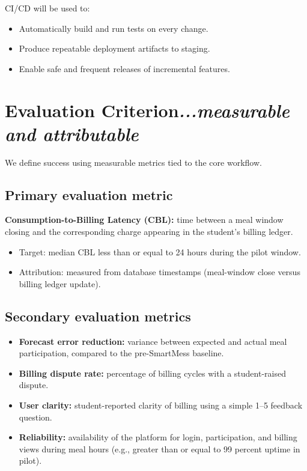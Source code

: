\documentclass[12pt,a4paper]{article}
\newcommand{\secann}[1]{\hfill\normalfont\itshape #1}
\begin{document}
CI/CD will be used to:

\begin{itemize}
    \item Automatically build and run tests on every change.
    \item Produce repeatable deployment artifacts to staging.
    \item Enable safe and frequent releases of incremental features.
\end{itemize}

\section{Evaluation Criterion\secann{...measurable and attributable}}

We define success using measurable metrics tied to the core workflow.

\subsection{Primary evaluation metric}

\textbf{Consumption-to-Billing Latency (CBL):} time between a meal window
closing and the corresponding charge appearing in the student's billing
ledger.

\begin{itemize}
    \item Target: median CBL less than or equal to 24 hours during the pilot window.
    \item Attribution: measured from database timestamps (meal-window close
    versus billing ledger update).
\end{itemize}

\subsection{Secondary evaluation metrics}

\begin{itemize}
    \item \textbf{Forecast error reduction:} variance between expected and
    actual meal participation, compared to the pre-SmartMess baseline.
    \item \textbf{Billing dispute rate:} percentage of billing cycles with a
    student-raised dispute.
    \item \textbf{User clarity:} student-reported clarity of billing using a
    simple 1--5 feedback question.
    \item \textbf{Reliability:} availability of the platform for login,
    participation, and billing views during meal hours (e.g., greater than or
    equal to 99 percent uptime in pilot).
\end{itemize}
\end{document}
